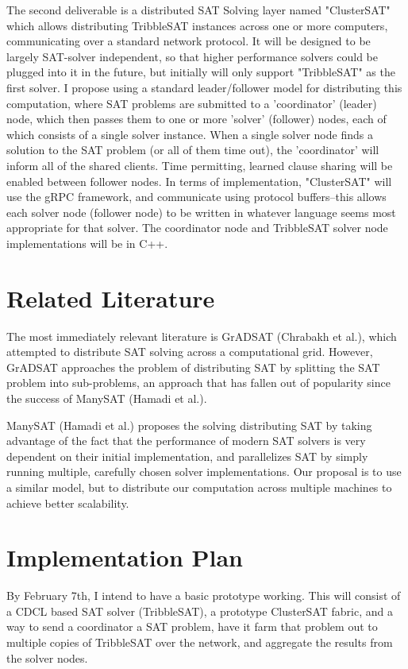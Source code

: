 \documentclass[10pt]{article}
\begin{document}
  The second deliverable is a distributed SAT Solving layer named "ClusterSAT" which allows distributing
  TribbleSAT instances across one or more computers, communicating over a standard network protocol.  It will
  be designed to be largely SAT-solver independent, so that higher performance solvers could be 
  plugged into it in the future, but initially will only support "TribbleSAT" as the first solver.
  I propose using a standard leader/follower model for distributing this computation, 
  where SAT problems are submitted to a 'coordinator' (leader) node, which then passes them to one or more 
  'solver' (follower) nodes, each of which consists of a single solver instance.  When a single solver node finds
  a solution to the SAT problem (or all of them time out), the 'coordinator' will inform all of the shared clients.
  Time permitting, learned clause sharing will be enabled between follower nodes. In terms of implementation, 
  "ClusterSAT" will use the gRPC framework, and communicate using protocol buffers--this allows each solver node 
  (follower node) to be written in whatever language seems most appropriate for that solver.  The coordinator node 
  and TribbleSAT solver node implementations will be in C++.

\section{Related Literature}
  The most immediately relevant literature is GrADSAT (Chrabakh et al.), which attempted to distribute SAT solving
  across a computational grid.  However, GrADSAT approaches the problem of distributing SAT by splitting the SAT problem
  into sub-problems, an approach that has fallen out of popularity since the success of ManySAT (Hamadi et al.).

  ManySAT (Hamadi et al.) proposes the solving distributing SAT by taking advantage of the fact that the performance of
  modern SAT solvers is very dependent on their initial implementation, and parallelizes SAT by simply running multiple,
  carefully chosen solver implementations.  Our proposal is to use a similar model, but to distribute our computation across
  multiple machines to achieve better scalability.

\section{Implementation Plan}
  By February 7th, I intend to have a basic prototype working.  This will consist of a CDCL based SAT solver (TribbleSAT),
  a prototype ClusterSAT fabric, and a way to send a coordinator a SAT problem, have it farm that problem out to multiple 
  copies of TribbleSAT over the network, and aggregate the results from the solver nodes.
\end{document}
